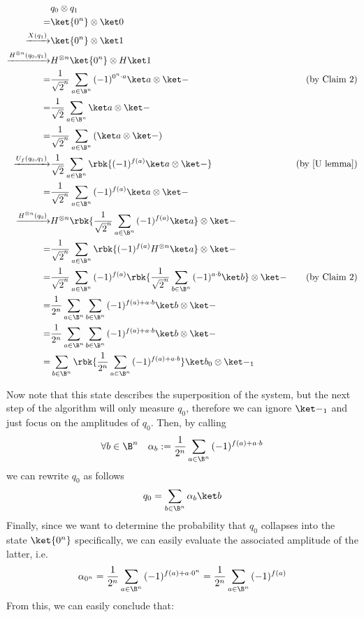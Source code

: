 \documentclass[a4paper, 12pt]{report}
\begin{document}
\begin{equation*}
    \begin{alignedat}{2}
        & q_0 \otimes q_1 & \\ 
        = & \ket{0^n} \otimes \ket 0 & \\ 
        \xrightarrow{X(q_1)} & \ket{0^n} \otimes \ket 1 & \\ 
        \xrightarrow{H^{\otimes n}(q_0, q_1)} & H^{\otimes n} \ket{0^n} \otimes H \ket 1 & \\ 
        = & \dfrac{1}{\sqrt 2^n} \sum_{a \in \B^n}{(-1)^{0^n \cdot a} \ket a} \otimes \ket - & \quad (\mbox{by Claim 2}) \\ 
        = & \dfrac{1}{\sqrt 2} \sum_{a \in \B^n}{\ket a} \otimes \ket -  & \\ 
        = & \dfrac{1}{\sqrt 2^n } \sum_{a \in \B^n}{(\ket a \otimes \ket - )} & \\ 
        \xrightarrow{U_f(q_0, q_1)} & \dfrac{1}{\sqrt 2} \sum_{a \in \B^n}{\rbk{(-1)^{f(a)} \ket a \otimes \ket - }} & \quad (\mbox{by \cref{U lemma}}) \\ 
        = & \dfrac{1}{\sqrt 2 ^n} \sum_{a \in \B^n}{(-1)^{f(a)} \ket a} \otimes \ket - & \\ 
        \xrightarrow{H^{\otimes n}(q_0)} & H^{\otimes n} \rbk{\dfrac{1}{\sqrt 2 ^n} \sum_{a \in \B^n}{(-1)^{f(a)} \ket a }} \otimes \ket - & \\ 
        = & \dfrac{1}{\sqrt 2 ^n} \sum_{a \in \B^n}{\rbk{(-1)^{f(a)} H^{\otimes n} \ket a }} \otimes \ket - & \\ 
        = & \dfrac{1}{\sqrt 2 ^n} \sum_{a \in \B^n}{(-1)^{f(a)} \rbk{\dfrac{1}{\sqrt 2^n} \sum_{b \in \B^n} {(-1)^{a \cdot b} \ket b}}} \otimes \ket - & \quad (\mbox{by Claim 2}) \\ 
        = & \dfrac{1}{2^n} \sum_{a \in \B^n}{\sum_{b \in \B^n}{(-1)^{f(a) + a \cdot b}} \ket b } \otimes \ket - & \\ 
        = & \dfrac{1}{2^n} \sum_{a \in \B^n}{\sum_{b \in \B^n}{(-1)^{f(a) + a \cdot b}} \ket b } \otimes \ket - & \\ 
        = & \sum_{b \in \B^n}{\rbk{\dfrac{1}{2^n}\sum_{a \in \B^n}{(-1)^{f(a) + a \cdot b}}} \ket b_0} \otimes \ket -_1 & \\
    \end{alignedat}
\end{equation*}

Now note that this state describes the superposition of the system, but the next step of the algorithm will only measure $q_0$, therefore we can ignore $\ket -_1$ and just focus on the amplitudes of $q_0$. Then, by calling $$\forall b \in \B^n \quad \alpha_b := \dfrac{1}{2^n} \sum_{a \in \B^n}{(-1)^{f(a) + a \cdot b}}$$ we can rewrite $q_0$ as follows $$q_0 = \sum_{b \in \B^n}{\alpha_b \ket b}$$ Finally, since we want to determine the probability that $q_0$ collapses into the state $\ket{0^n}$ specifically, we can easily evaluate the associated amplitude of the latter, i.e. $$\alpha_{0^n} = \dfrac{1}{2^n}\sum_{a \in \B^n}{(-1)^{f(a)+ a \cdot 0^n}} = \dfrac{1}{2^n} \sum_{a \in \B^n}{(-1)^{f(a)}}$$ From this, we can easily conclude that:
\end{document}
